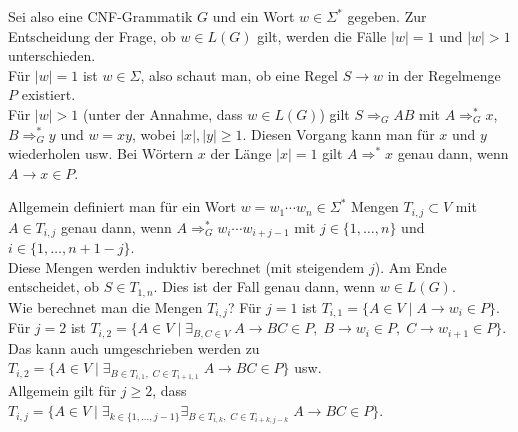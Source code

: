 \begin{Bem}
    Sei also eine CNF-Grammatik $G$ und ein Wort $w \in \Sigma^\ast$ gegeben.
    Zur Entscheidung der Frage, ob $w \in L(G)$ gilt, werden die Fälle
    $|w| = 1$ und $|w| > 1$ unterschieden.\\
    Für $|w| = 1$ ist $w \in \Sigma$, also schaut man, ob eine Regel
    $S \rightarrow w$ in der Regelmenge $P$ existiert.\\
    Für $|w| > 1$ (unter der Annahme, dass $w \in L(G)$)
    gilt $S \Rightarrow_G AB$ mit $A \Rightarrow_G^\ast x$,
    $B \Rightarrow_G^\ast y$ und $w = xy$, wobei $|x|, |y| \ge 1$.
    Diesen Vorgang kann man für $x$ und $y$ wiederholen usw.
    Bei Wörtern $x$ der Länge $|x| = 1$ gilt $A \Rightarrow^\ast x$ genau dann,
    wenn $A \rightarrow x \in P$.
    
    Allgemein definiert man für ein Wort $w = w_1 \dotsb w_n \in \Sigma^\ast$
    Mengen $T_{i,j} \subset V$ mit $A \in T_{i,j}$ genau dann, wenn
    $A \Rightarrow_G^\ast w_i \dotsb w_{i+j-1}$ mit
    $j \in \{1, \dotsc, n\}$
    und $i \in \{1, \dotsc, n + 1 - j\}$.\\
    Diese Mengen werden induktiv berechnet (mit steigendem $j$).
    Am Ende entscheidet, ob $S \in T_{1,n}$.
    Dies ist der Fall genau dann, wenn $w \in L(G)$.\\
    Wie berechnet man die Mengen $T_{i,j}$?
    Für $j = 1$ ist $T_{i,1} = \{A \in V \;|\; A \rightarrow w_i \in P\}$.
    Für $j = 2$ ist $T_{i,2} = \{A \in V \;|\;
    \exists_{B, C \in V}\; A \rightarrow BC \in P,\; B \rightarrow w_i \in P,\;
    C \rightarrow w_{i+1} \in P\}$.
    Das kann auch umgeschrieben werden zu
    $T_{i,2} = \{A \in V \;|\; \exists_{B \in T_{i,1},\; C \in T_{i+1,1}}\;
    A \rightarrow BC \in P\}$ usw.\\
    Allgemein gilt für $j \ge 2$, dass $T_{i,j} = \{A \in V \;|\;
    \exists_{k \in \{1, \dotsc, j - 1\}}
    \exists_{B \in T_{i,k},\; C \in T_{i+k,j-k}}\; A \rightarrow BC \in P\}$.
    

\end{Bem}
